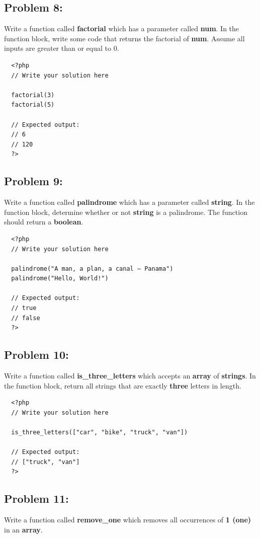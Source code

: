 \documentclass{article}
\begin{document}
\subsection*{Problem 8:}
Write a function called \textbf{factorial} which has a parameter called \textbf{num}. In the function block, write some code that returns the factorial of \textbf{num}. Assume all inputs are greater than or equal to 0. 

\begin{verbatim}
  <?php  
  // Write your solution here

  factorial(3)
  factorial(5)

  // Expected output:
  // 6
  // 120
  ?>
\end{verbatim}

\subsection*{Problem 9:}
Write a function called \textbf{palindrome} which has a parameter called \textbf{string}. In the function block, determine whether or not \textbf{string} is a palindrome. The function should return a \textbf{boolean}.

\begin{verbatim}
  <?php  
  // Write your solution here

  palindrome("A man, a plan, a canal – Panama")
  palindrome("Hello, World!")

  // Expected output:
  // true
  // false
  ?>
\end{verbatim}

\subsection*{Problem 10:}
Write a function called \textbf{is\_three\_letters} which accepts an \textbf{array} of \textbf{strings}. In the function block, return all strings that are exactly \textbf{three} letters in length.

\begin{verbatim}
  <?php  
  // Write your solution here

  is_three_letters(["car", "bike", "truck", "van"])

  // Expected output:
  // ["truck", "van"]
  ?>
\end{verbatim}

\subsection*{Problem 11:}
Write a function called \textbf{remove\_one} which removes all occurrences of \textbf{1 (one)} in an \textbf{array}. 
\end{document}
